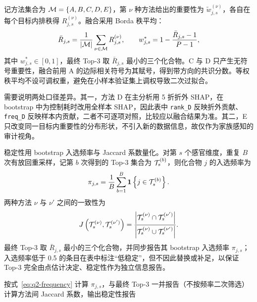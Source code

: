 记方法集合为 $\mathcal{M}=\{A,B,C,D,E\}$，第 $\nu$ 种方法给出的重要性为 $\tilde{w}_{j,s}^{(\nu)}$，各自在每个目标内排秩得 $R^{(\nu)}_{j,s}$。融合采用 Borda 秩平均：
\begin{equation}
  \bar{R}_{j,s}=\frac{1}{|\mathcal{M}|}\sum_{\nu\in\mathcal{M}}R^{(\nu)}_{j,s},
  \qquad
  w_{j,s}^{*}=1-\frac{\bar{R}_{j,s}-1}{P-1},
  \label{eq:q2-ensemble}
\end{equation}
其中 $w_{j,s}^{*}\in[0,1]$，最终 Top-3 取 $\bar{R}_{j,s}$ 最小的三个化合物。C 与 D 只产生无符号重要性，融合前用 A 的边际相关符号为其赋号，得到带方向的共识分数。等权秩平均不设可调权重，避免在小样本验证集上调权导致二次过拟合。

需要说明两处口径差异。其一，方法 D 在主分析用 5 折折外 SHAP，在 bootstrap 中为控制耗时改用全样本 SHAP，因此表中 \texttt{rank\_D} 反映折外贡献、\texttt{freq\_D} 反映样本内贡献，二者不可逐项对照，比较应以融合结果为准。其二，E 只改变同一目标内重要性的分布形状，不引入新的数据信息，故仅作为家族感知的审计视角。

稳定性用 bootstrap 入选频率与 Jaccard 系数量化。对第 $s$ 个感官维度，重复 $B$ 次有放回重采样，记第 $b$ 次得到的 Top-3 集合为 $\mathcal{T}_s^{(b)}$，则化合物 $j$ 的入选频率为
\begin{equation}
  \pi_{j,s}=\frac{1}{B}\sum_{b=1}^{B}\mathbf{1}\left\{j\in\mathcal{T}_s^{(b)}\right\}.
  \label{eq:q2-frequency}
\end{equation}
两种方法 $\nu$ 与 $\nu'$ 之间的一致性为
\begin{equation}
  J\left(\mathcal{T}_s^{(\nu)},\mathcal{T}_s^{(\nu')}\right)=
  \frac{\left\lvert \mathcal{T}_s^{(\nu)}\cap\mathcal{T}_s^{(\nu')} \right\rvert}
  {\left\lvert \mathcal{T}_s^{(\nu)}\cup\mathcal{T}_s^{(\nu')} \right\rvert}.
  \label{eq:q2-jaccard}
\end{equation}
最终 Top-3 取 $\bar{R}_{j,s}$ 最小的三个化合物，并同步报告其 bootstrap 入选频率 $\pi_{j,s}$；入选频率低于 0.5 的条目在表中标注“低稳定”，但不因此替换或补足，以保证 Top-3 完全由点估计决定、稳定性作为独立信息报告\citep{efron1979bootstrap,jaccard1901etude}。

\begin{algorithm}[htbp]
  \small
  \caption{基于 bootstrap 的 Top-3 稳定性选择}
  \label{alg:stability}
  按式~\eqref{eq:q2-frequency} 计算 $\pi_{j,s}$，与最终 Top-3 一并报告（不按频率二次筛选）\;
  计算方法间 Jaccard 系数，输出稳定性报告\;
\end{algorithm}

